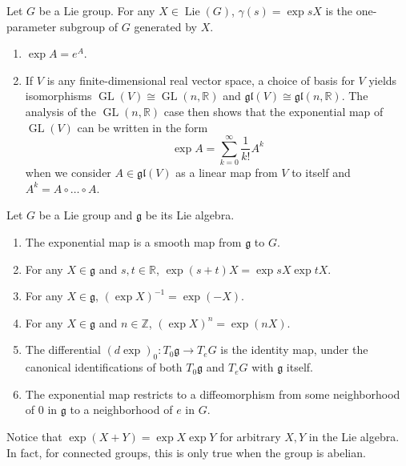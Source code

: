\begin{prop}
	Let $G$ be a Lie group. For any $X\in\operatorname{Lie}(G)$, $\gamma(s)=\operatorname{exp} sX$ is the one-parameter subgroup of $G$ generated by $X$.
\end{prop}
\begin{example}\leavevmode
	\begin{enumerate}
		\item $\operatorname{exp} A=e^A$.
		\item If $V$ is any finite-dimensional real vector space, a choice of basis for $V$ yields isomorphisms $\operatorname{GL}(V)\cong\operatorname{GL}(n,\mathbb{R})$ and $\mathfrak{gl}(V)\cong\mathfrak{gl}(n,\mathbb{R})$. The analysis of the $\operatorname{GL}(n,\mathbb{R})$ case then shows that the exponential map of $\operatorname{GL}(V)$ can be written in the form
		\[\operatorname{exp} A=\sum_{k=0}^\infty\frac{1}{k!}A^k\]
		when we consider $A\in\mathfrak{gl}(V)$ as a linear map from $V$ to itself and $A^k=A\circ\ldots\circ A$.
	\end{enumerate}
\end{example}
\begin{prop}
	Let $G$ be a Lie group and $\mathfrak{g}$ be its Lie algebra.
	\begin{enumerate}
		\item The exponential map is a smooth map from $\mathfrak{g}$ to $G$.
		\item For any $X\in\mathfrak{g}$ and $s,t\in\mathbb{R}$, $\operatorname{exp}(s+t)X=\operatorname{exp} sX\operatorname{exp} tX$.
		\item For any $X\in\mathfrak{g}$, $(\operatorname{exp} X)^{-1}=\operatorname{exp}(-X)$.
		\item For any $X\in\mathfrak{g}$ and $n\in \mathbb{Z}$, $(\operatorname{exp} X)^n=\operatorname{exp}(nX)$.
		\item The differential $(d\operatorname{exp})_0:T_0\mathfrak{g}\to T_eG$ is the identity map, under the canonical identifications of both $T_0\mathfrak{g}$ and $T_eG$ with $\mathfrak{g}$ itself.
		\item The exponential map restricts to a diffeomorphism from some neighborhood of 0 in $\mathfrak{g}$ to a neighborhood of $e$ in $G$.
	\end{enumerate}
\end{prop}
Notice that $\operatorname{exp}(X+Y)=\operatorname{exp} X\operatorname{exp} Y$ for arbitrary $X,Y$ in the Lie algebra. In fact, for connected groups, this is only true when the group is abelian.

